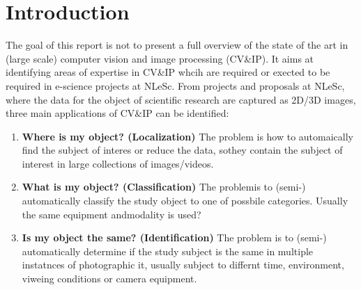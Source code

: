 \section{Introduction}
\label{sec:intro}

The goal of this report is not to present a full overview of the state of the art in (large scale) computer vision and image processing (CV\&IP). It aims at identifying areas of expertise in CV\&IP whcih are required or exected to be required in e-science projects at NLeSc. From projects and proposals at NLeSc, where the data for the object of scientific research are captured as 2D/3D images, three main applications of CV\&IP  can be identified:
\begin{enumerate}
\item {\bf Where is my object? (Localization)} The problem is how to automaically find the subject of interes or reduce the data, sothey contain the subject of interest in large collections of images/videos.
\item {\bf What is my object? (Classification)}  The problemis to (semi-) automatically classify the study object to one of possbile categories. Usually the same equipment andmodality is used?
\item {\bf Is my object the same? (Identification)} The problem is to (semi-) automatically determine if the study subject is the same in multiple instatnces of photographic it, usually subject to differnt time, environment, viweing conditions or camera equipment.  
\end{enumerate}

